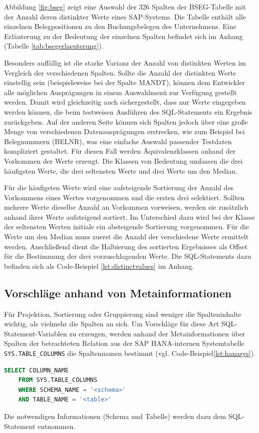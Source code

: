 Abbildung \ref{fig:bseg} zeigt eine Auswahl der 326 Spalten der BSEG-Tabelle mit der Anzahl deren distinkter Werte eines SAP-Systems.
Die Tabelle enthält alle einzelnen Belegpositionen zu den Buchungsbelegen des Unternehmens.
Eine Erläuterung zu der Bedeutung der einzelnen Spalten befindet sich im Anhang (Tabelle \ref{tab:bsegerlaeuterung}).

Besonders auffällig ist die starke Varianz der Anzahl von distinkten Werten im Vergleich der verschiedenen Spalten.
Sollte die Anzahl der distinkten Werte einstellig sein (beispielsweise bei der Spalte MANDT), können dem Entwickler alle möglichen Ausprägungen in einem Auswahlmenü zur Verfügung gestellt werden.
Damit wird gleichzeitig auch sichergestellt, dass nur Werte eingegeben werden können, die beim testweisen Ausführen des SQL-Statements ein Ergebnis zurückgeben.
Auf der anderen Seite können sich Spalten jedoch über eine große Menge von verschiedenen Datenausprägungen erstrecken, wie zum Beispiel bei Belegnummern (BELNR), was eine einfache Auswahl passender Testdaten kompliziert gestaltet.
Für diesen Fall werden Äquivalenzklassen anhand der Vorkommen der Werte erzeugt. Die Klassen von Bedeutung umfassen die drei häufigsten Werte, die drei seltensten Werte und drei Werte um den Median.

Für die häufigsten Werte wird eine aufsteigende Sortierung der Anzahl des Vorkommens eines Wertes vorgenommen und die ersten drei selektiert.
Sollten mehrere Werte dieselbe Anzahl an Vorkommen vorweisen, werden sie zusätzlich anhand ihrer Werte aufsteigend sortiert.
Im Unterschied dazu wird bei der Klasse der seltensten Werten initiale ein absteigende Sortierung vorgenommen.
Für die Werte um den Median muss zuerst die Anzahl der verschiedene Werte ermittelt werden.
Anschließend dient die Halbierung des sortierten Ergebnisses als Offset für die Bestimmung der drei vorzuschlagenden Werte.
Die SQL-Statements dazu befinden sich als Code-Beispiel \ref{lst:distinctvalues} im Anhang.

\subsection{Vorschläge anhand von Metainformationen}\label{chap:databasemeta}
Für Projektion, Sortierung oder Gruppierung sind weniger die Spalteninhalte wichtig, als vielmehr die Spalten an sich.
Um Vorschläge für diese Art SQL-Statement-Variablen zu erzeugen, werden anhand der Metainformationen über Spalten der betrachteten Relation aus der SAP HANA-internen Systemtabelle \texttt{SYS.TABLE\_COLUMNS} die Spaltennamen bestimmt (vgl. Code-Beispiel\ref{lst:hanasys}).
\begin{lstlisting}[caption={Systemtabellen von SAP HANA liefern Metainformationen zu Relationen}, label={lst:hanasys}, language=SQL]
	SELECT COLUMN_NAME
	FROM SYS.TABLE_COLUMNS
	WHERE SCHEMA_NAME = '<schema>'
	AND TABLE_NAME = '<table>'
\end{lstlisting}
Die notwendigen Informationen (Schema und Tabelle) werden dazu dem SQL-Statement entnommen.

